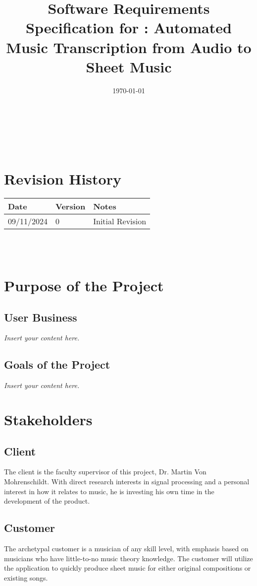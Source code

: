 \documentclass[12pt]{article}
\newcommand{\lips}{\textit{Insert your content here.}}
\begin{document}
\title{Software Requirements Specification for \progname: Automated Music Transcription from Audio to Sheet Music} 
\author{\authname}
\date{\today}
	
\maketitle

~\newpage


\tableofcontents

~\newpage

\section*{Revision History}

\begin{tabularx}{\textwidth}{p{3cm}p{2cm}X}
\toprule {\textbf{Date}} & {\textbf{Version}} & {\textbf{Notes}}\\
\midrule
09/11/2024 & 0 & Initial Revision\\
\bottomrule
\end{tabularx}

~\\

~\newpage
\section{Purpose of the Project}
\subsection{User Business}
\lips
\subsection{Goals of the Project}
\lips
\section{Stakeholders}
\subsection{Client}
The client is the faculty supervisor of this project, Dr. Martin Von Mohrenschildt. With direct research interests in signal processing and a personal interest in how it relates to 
music, he is investing his own time in the development of the product.
\subsection{Customer}
The archetypal customer is a musician of any skill level, with emphasis based on musicians who have little-to-no music theory knowledge. The customer will utilize the application 
to quickly produce sheet music for either original compositions or existing songs. 
\end{document}
